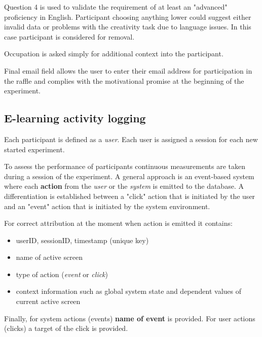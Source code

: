 	Question 4 is used to validate the requirement of at least an "advanced" proficiency in English. Participant choosing anything lower could suggest either invalid data or problems with the creativity task due to language issues. In this case participant is considered for removal. 
	
	Occupation is asked simply for additional context into the participant.
	
	Final email field allows the user to enter their email address for participation in the raffle and complies with the motivational promise at the beginning of the experiment.

	\subsection{E-learning activity logging} \label{sec:activitylog}
	
	
	Each participant is defined as a \textit{user}. Each user is assigned a session for each new started experiment. 
	
	To assess the performance of participants continuous measurements are taken during a session of the experiment. A general approach is an event-based system where each \textbf{action} from the \textit{user} or the \textit{system} is emitted to the database. A differentiation is established between a "click" action that is initiated by the user and an "event" action that is initiated by the system environment.
	
	For correct attribution at the moment when action is emitted it contains: 
	\begin{itemize}
		\item userID, sessionID, timestamp (unique key)
		\item name of active screen
		\item type of action (\textit{event} or \textit{click})
		\item context information such as global system state and dependent values of current active screen
	\end{itemize}

	Finally, for system actions (events) \textbf{name of event} is provided. For user actions (clicks) a target of the click is provided.
	

